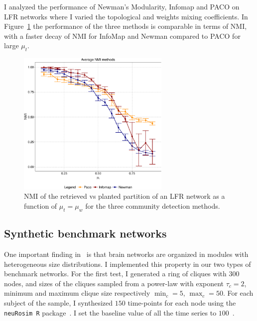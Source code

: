I analyzed the performance of Newman's Modularity, Infomap and PACO on LFR networks where I varied the topological and weights mixing coefficients.
In Figure~\ref{fig:avgmutmuw} the performance of the three methods is comparable in terms of NMI, with a faster decay of NMI for InfoMap and Newman compared to PACO for large $\mu_t$.

\begin{figure}[htb!]
\centering
\includegraphics[width=0.65\textwidth]{images/avg_nmi_allmethods_lfr_errorbars.pdf}
\caption{NMI of the retrieved vs planted partition of an LFR network as a function of $\mu_t=\mu_w$ for the three community detection methods.}
\label{fig:avgmutmuw}
\end{figure}

\subsection{Synthetic benchmark networks}
One important finding in~\cite{nicolini2016} is that brain networks are organized in modules with heterogeneous size distributions.
I implemented this property in our two types of benchmark networks.
For the first test, I generated a ring of cliques with $300$ nodes, and sizes of the cliques sampled from a power-law with exponent $\tau_c=2$, minimum and maximum clique size respectively $\min_c=5$, $\max_c=50$.
For each subject of the sample, I synthesized $150$ time-points for each node using the \texttt{neuRosim R} package~\cite{neurosim2011}.
I set the baseline value of all the time series to $100$~\cite{welvaert2013}.

